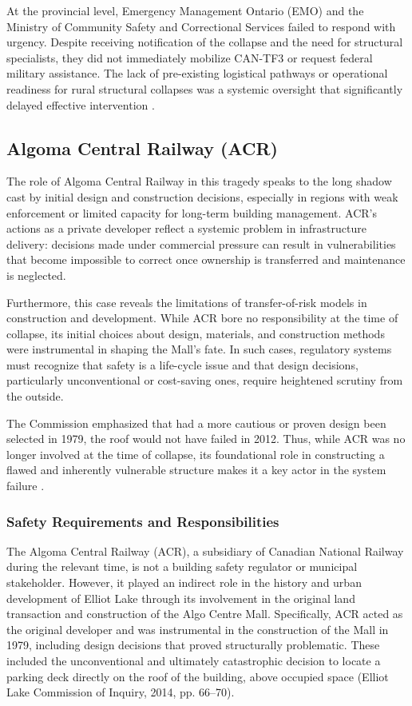 \documentclass[12pt]{article}
\begin{document}
At the provincial level, Emergency Management Ontario (EMO) and the Ministry of Community Safety and Correctional Services failed to respond with urgency. Despite receiving notification of the collapse and the need for structural specialists, they did not immediately mobilize CAN-TF3 or request federal military assistance. The lack of pre-existing logistical pathways or operational readiness for rural structural collapses was a systemic oversight that significantly delayed effective intervention \cite[p286–289]{AlgoLakeReport1}.

\subsection{Algoma Central Railway (ACR)}
The role of Algoma Central Railway in this tragedy speaks to the long shadow cast by initial design and construction decisions, especially in regions with weak enforcement or limited capacity for long-term building management. ACR’s actions as a private developer reflect a systemic problem in infrastructure delivery: decisions made under commercial pressure can result in vulnerabilities that become impossible to correct once ownership is transferred and maintenance is neglected.

Furthermore, this case reveals the limitations of transfer-of-risk models in construction and development. While ACR bore no responsibility at the time of collapse, its initial choices about design, materials, and construction methods were instrumental in shaping the Mall’s fate. In such cases, regulatory systems must recognize that safety is a life-cycle issue and that design decisions, particularly unconventional or cost-saving ones, require heightened scrutiny from the outside.

The Commission emphasized that had a more cautious or proven design been selected in 1979, the roof would not have failed in 2012. Thus, while ACR was no longer involved at the time of collapse, its foundational role in constructing a flawed and inherently vulnerable structure makes it a key actor in the system failure \cite[p66–70]{AlgoLakeReport1}.

\subsubsection*{Safety Requirements and Responsibilities}

The Algoma Central Railway (ACR), a subsidiary of Canadian National Railway during the relevant time, is not a building safety regulator or municipal stakeholder. However, it played an indirect role in the history and urban development of Elliot Lake through its involvement in the original land transaction and construction of the Algo Centre Mall. Specifically, ACR acted as the original developer and was instrumental in the construction of the Mall in 1979, including design decisions that proved structurally problematic. These included the unconventional and ultimately catastrophic decision to locate a parking deck directly on the roof of the building, above occupied space \cite[p66–70]{AlgoLakeReport1}(Elliot Lake Commission of Inquiry, 2014, pp. 66–70).
\end{document}
